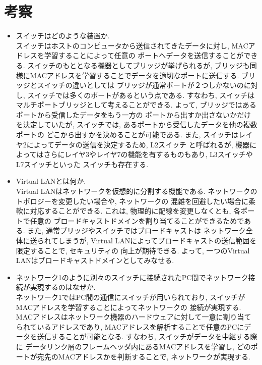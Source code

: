 \documentclass{jsarticle}
\begin{document}
\section{考察}
\begin{itemize}
	\item スイッチはどのような装置か. \\
		スイッチはホストのコンピュータから送信されてきたデータに対し, MACアドレスを学習することによって任意の
			ポートへデータを送信することができる. スイッチのもととなる機器としてブリッジが挙げられるが, 
			ブリッジも同様にMACアドレスを学習することでデータを適切なポートに送信する. ブリッジとスイッチの違いとしては
			ブリッジが通常ポートが２つしかないのに対し, スイッチでは多くのポートがあるという点である. すなわち, スイッチは
			マルチポートブリッジとして考えることができる. よって, ブリッジではあるポートから受信したデータをもう一方の
			ポートから出すか出さないかだけを決定していたが, スイッチでは, あるポートから受信したデータを他の複数ポートの
			どこから出すかを決めることが可能である. また, スイッチはレイヤ2によってデータの送信を決定するため, L2スイッチ
			と呼ばれるが, 機器によってはさらにレイヤ3やレイヤ7の機能を有するものもあり, L3スイッチやL7スイッチといった
			スイッチも存在する. \\
		
	\item Virtual LANとは何か. \\
		Virtual LANはネットワークを仮想的に分割する機能である. ネットワークのトポロジーを変更したい場合や, ネットワークの
		混雑を回避したい場合に柔軟に対応することができる. これは, 物理的に配線を変更しなくとも, 各ポートで任意の
		ブロードキャストドメインを割り当てることができるためである. また, 通常ブリッジやスイッチではブロードキャストは
		ネットワーク全体に送られてしまうが, Virtual LANによってブロードキャストの送信範囲を限定することで, セキュリティの
		向上が期待できる. よって, 一つのVirtual LANはブロードキャストドメインとしてみなせる. \\
	
	\item  ネットワーク1のように別々のスイッチに接続されたPC間でネットワーク接続が実現するのはなぜか.  \\
		ネットワーク1ではPC間の通信にスイッチが用いられており, スイッチがMACアドレスを学習することによってネットワークの
		接続が実現する. MACアドレスはネットワーク機器のハードウェアに対して一意に割り当てられているアドレスであり, 
		MACアドレスを解析することで任意のPCにデータを送信することが可能となる. すなわち, スイッチがデータを中継する際に
		データリンク層のフレームヘッダ内にあるMACアドレスを学習し, どのポートが宛先のMACアドレスかを判断することで, 
		ネットワークが実現する. \\
	

\end{itemize}
\end{document}
